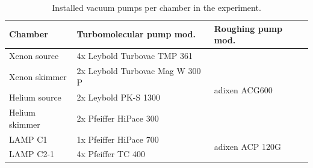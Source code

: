 \begin{table}
	\centering
\begin{tabular}{ | l | l | l | }
\hline
	\textbf{Chamber} & \textbf{Turbomolecular pump mod.} & \textbf{Roughing pump mod.} \\ \hline
	Xenon source & 4x Leybold Turbovac TMP 361 & \multirow{4}{*}{adixen ACG600} \\ 
	Xenon skimmer & 2x Leybold Turbovac Mag W 300 P &  \\ 
	Helium source & 2x Leybold PK-S 1300 & \\ 
	Helium skimmer & 2x Pfeiffer HiPace 300 & \\ \hline
	LAMP C1 & 1x Pfeiffer HiPace 700 & \multirow{2}{*}{adixen ACP 120G} \\ 
	LAMP C2-1 & 4x Pfeiffer TC 400 & \\ \hline
\end{tabular}
\caption[Installed vacuum pumps in the experiment.]{Installed vacuum pumps per chamber in the experiment.}
\label{tab:vacuum-table}
\end{table}
